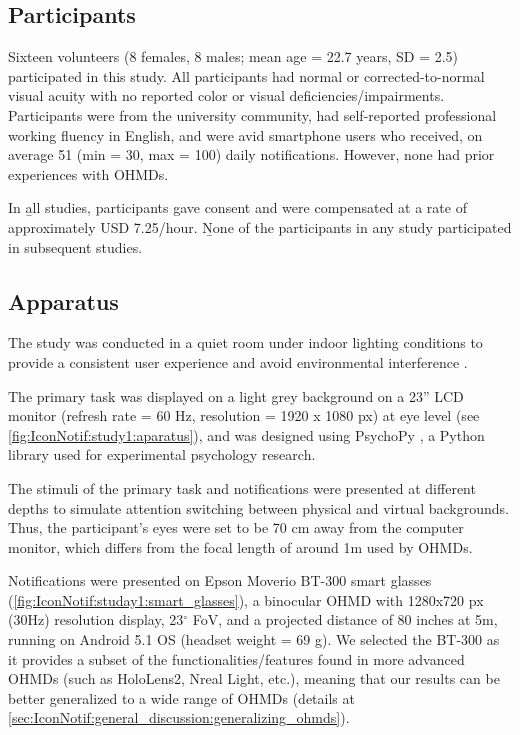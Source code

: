 \subsection{Participants}
\label{sec:IconNotif:study1:participants}

Sixteen volunteers (8 females, 8 males; mean age = 22.7 years, SD = 2.5) participated in this study. All participants had normal or corrected-to-normal visual acuity with no reported color or visual deficiencies/impairments. Participants were from the university community, had self-reported professional working fluency in English, and were avid smartphone users who received, on average 51 (min = 30, max = 100) daily notifications. However, none had prior experiences with OHMDs. 

In \b{all} studies, participants gave consent and were compensated at a rate of approximately USD 7.25/hour. \b{None} of the participants in any study participated in subsequent studies.

\subsection{Apparatus}
\label{sec:IconNotif:study1:apparatus}

The study was conducted in a quiet room under indoor lighting conditions to provide a consistent user experience and avoid environmental interference \cite{gabbard_effects_2006, debernardis_text_2014}. 

The primary task was displayed on a light grey background on a 23'' LCD monitor (refresh rate = 60 Hz, resolution = 1920 x 1080 px) at eye level (see \autoref{fig:IconNotif:study1:aparatus}), and was designed using PsychoPy \cite{peirce_psychopy2_2019}, a Python library used for experimental psychology research.

The stimuli of the primary task and notifications were presented at different depths to simulate attention switching between physical and virtual backgrounds. Thus, the participant's eyes were set to be 70 cm away from the computer monitor, which differs from the focal length of around 1m \cite{laramee_rivalry_2002} used by OHMDs. 

Notifications were presented on Epson Moverio BT-300 smart glasses \cite{epson_tech_2020} (\autoref{fig:IconNotif:studay1:smart_glasses}), a binocular OHMD with 1280x720 px (30Hz) resolution display, 23$^{\circ}$ FoV, and a projected distance of 80 inches at 5m, running on Android 5.1 OS (headset weight = 69 g).
We selected the BT-300 as it provides a subset of the functionalities/features found in more advanced OHMDs (such as HoloLens2, Nreal Light, etc.), meaning that our results can be better generalized to a wide range of OHMDs (details at \autoref{sec:IconNotif:general_discussion:generalizing_ohmds}).

